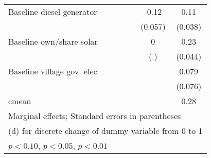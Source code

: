 \begin{table}[htbp]
\begin{tabular*}{1\hsize}{@{\hskip\tabcolsep\extracolsep\fill}l*{5}{c}}
Baseline diesel generator&                  &                  &                  &    -0.12\sym{**} &     0.11\sym{***}\\
                &                  &                  &                  &  (0.057)         &  (0.038)         \\
Baseline own/share solar&                  &                  &                  &        0         &     0.23\sym{***}\\
                &                  &                  &                  &      (.)         &  (0.044)         \\
Baseline village gov. elec&                  &                  &                  &                  &    0.079         \\
                &                  &                  &                  &                  &  (0.076)         \\
\midrule
cmean           &                  &                  &                  &                  &     0.28         \\
\bottomrule
\multicolumn{6}{l}{\footnotesize Marginal effects; Standard errors in parentheses}\\
\multicolumn{6}{l}{\footnotesize  (d) for discrete change of dummy variable from 0 to 1}\\
\multicolumn{6}{l}{\footnotesize \sym{*} \(p<0.10\), \sym{**} \(p<0.05\), \sym{***} \(p<0.01\)}\\
\end{tabular*}
\end{table}
